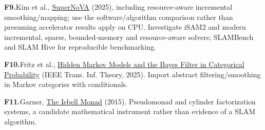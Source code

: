 \documentclass[11pt,letterpaper]{article}
\newcommand{\refitem}[2]{\par\noindent\textbf{#1}\enspace #2}
\begin{document}
\refitem{F9.}{Kim et al., \href{https://doi.org/10.1145/3669940.3707258}{SuperNoVA} (2025), including resource-aware incremental smoothing/mapping; use the software/algorithm comparison rather than presuming accelerator results apply on CPU. Investigate iSAM2 and modern incremental, sparse, bounded-memory and resource-aware solvers; SLAMBench and SLAM Hive for reproducible benchmarking.}
\refitem{F10.}{Fritz et al., \href{https://arxiv.org/abs/2401.14669}{Hidden Markov Models and the Bayes Filter in Categorical Probability} (IEEE Trans. Inf. Theory, 2025). Import abstract filtering/smoothing in Markov categories with conditionals.}
\refitem{F11.}{Garner, \href{https://doi.org/10.1016/j.aim.2015.01.015}{The Isbell Monad} (2015). Pseudomonad and cylinder factorization systems, a candidate mathematical instrument rather than evidence of a SLAM algorithm.}
\normalsize
\end{document}
